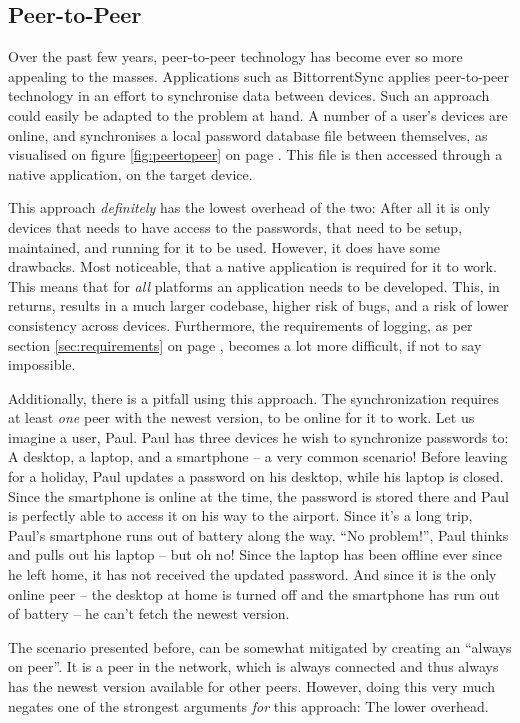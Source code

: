 		\subsection{Peer-to-Peer}
			Over the past few years, peer-to-peer technology has become ever so more appealing to the masses. Applications such as BittorrentSync applies peer-to-peer technology in an effort to synchronise data between devices. Such an approach could easily be adapted to the problem at hand. A number of a user's devices are online, and synchronises a local password database file between themselves, as visualised on figure \ref{fig:peertopeer} on page \pageref{fig:peertopeer}. This file is then accessed through a native application, on the target device. 

			This approach \emph{definitely} has the lowest overhead of the two: After all it is only devices that needs to have access to the passwords, that need to be setup, maintained, and running for it to be used. However, it does have some drawbacks. Most noticeable, that a native application is required for it to work. This means that for \emph{all} platforms an application needs to be developed. This, in returns, results in a much larger codebase, higher risk of bugs, and a risk of lower consistency across devices. Furthermore, the requirements of logging, as per section \ref{sec:requirements} on page \pageref{sec:requirements}, becomes a lot more difficult, if not to say impossible.

			Additionally, there is a pitfall using this approach. The synchronization requires at least \emph{one} peer with the newest version, to be online for it to work. Let us imagine a user, Paul. Paul has three devices he wish to synchronize passwords to: A desktop, a laptop, and a smartphone -- a very common scenario! Before leaving for a holiday, Paul updates a password on his desktop, while his laptop is closed. Since the smartphone is online at the time, the password is stored there and Paul is perfectly able to access it on his way to the airport. Since it's a long trip, Paul's smartphone runs out of battery along the way. ``No problem!'', Paul thinks and pulls out his laptop -- but oh no! Since the laptop has been offline ever since he left home, it has not received the updated password. And since it is the only online peer -- the desktop at home is turned off and the smartphone has run out of battery -- he can't fetch the newest version. 

			The scenario presented before, can be somewhat mitigated by creating an ``always on peer''. It is a peer in the network, which is always connected and thus always has the newest version available for other peers. However, doing this very much negates one of the strongest arguments \emph{for} this approach: The lower overhead.

